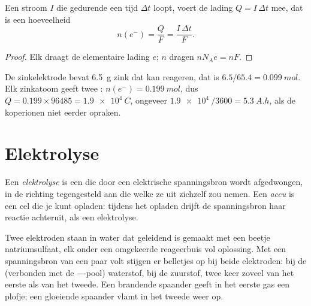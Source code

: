 \begin{proposition}\label{prop:g12:cells-and-electrolysis:charge}
Een stroom $I$ die gedurende een tijd $\Delta t$ loopt, voert de lading
$Q = I\,\Delta t$ mee, dat is een hoeveelheid 
\[
  n(e^-) = \frac{Q}{F} = \frac{I\,\Delta t}{F} .
\]
\end{proposition}

\begin{proof}
Elk  draagt de elementaire lading $e$; $n$   dragen
$n N_A e = n F$.
\end{proof}

\begin{example}\label{ex:g12:cells-and-electrolysis:capacity}
De zinkelektrode bevat \qty{6.5}{g} zink dat kan reageren, dat is
$6.5/65.4 = \qty{0.099}{mol}$. Elk zinkatoom geeft twee :
$n(e^-) = \qty{0.199}{mol}$, dus $Q = 0.199 \times 96485 = \qty{1.9e4}{C}$,
ongeveer $\qty{1.9e4}{}/3600 = \qty{5.3}{A.h}$, als de koperionen niet
eerder opraken.
\end{example}

\section{Elektrolyse}

\begin{definition}\label{def:g12:cells-and-electrolysis:electrolysis}
Een \emph{elektrolyse} is een  die door
een elektrische spanningsbron wordt afgedwongen, in de richting
tegengesteld aan die welke ze uit zichzelf zou nemen. Een
\emph{accu} is een cel die je kunt opladen: tijdens het
opladen drijft de spanningsbron haar reactie achteruit, als een
elektrolyse.
\end{definition}

\begin{inthelab}
Twee elektroden staan in water dat geleidend is gemaakt met een beetje
natriumsulfaat, elk onder een omgekeerde reageerbuis vol oplossing. Met
een spanningsbron van een paar volt stijgen er belletjes op bij beide
elektroden: bij de  (verbonden met de $-$-pool) waterstof, bij de
 zuurstof, twee keer zoveel van het eerste als van het tweede. Een
brandende spaander geeft in het eerste gas een plofje; een gloeiende
spaander vlamt in het tweede weer op.
\end{inthelab}

